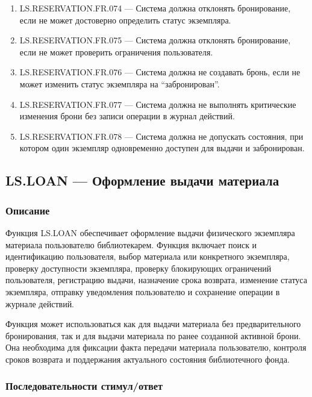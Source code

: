 \documentclass[12pt,a4paper]{article}
\begin{document}
\begin{enumerate}
		\item LS.RESERVATION.FR.074 --- Система должна отклонять бронирование, если не
		может достоверно определить статус экземпляра.
		
		\item LS.RESERVATION.FR.075 --- Система должна отклонять бронирование, если не
		может проверить ограничения пользователя.
		
		\item LS.RESERVATION.FR.076 --- Система должна не создавать бронь, если не может
		изменить статус экземпляра на ``забронирован''.
		
		\item LS.RESERVATION.FR.077 --- Система должна не выполнять критические
		изменения брони без записи операции в журнал действий.
		
		\item LS.RESERVATION.FR.078 --- Система должна не допускать состояния, при
		котором один экземпляр одновременно доступен для выдачи и забронирован.
	\end{enumerate}
	
	\subsection{LS.LOAN --- Оформление выдачи материала}
	
	\subsubsection{Описание}
	
	Функция LS.LOAN обеспечивает оформление выдачи физического экземпляра
	материала пользователю библиотекарем. Функция включает поиск и идентификацию
	пользователя, выбор материала или конкретного экземпляра, проверку доступности
	экземпляра, проверку блокирующих ограничений пользователя, регистрацию выдачи,
	назначение срока возврата, изменение статуса экземпляра, отправку уведомления
	пользователю и сохранение операции в журнале действий.
	
	Функция может использоваться как для выдачи материала без предварительного
	бронирования, так и для выдачи материала по ранее созданной активной брони.
	Она необходима для фиксации факта передачи материала пользователю, контроля
	сроков возврата и поддержания актуального состояния библиотечного фонда.
	
	\subsubsection{Последовательности стимул/ответ}
	
\end{document}
